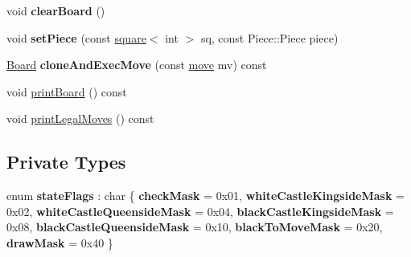 \begin{DoxyCompactItemize}
\mbox{\label{classBoard_a5f148daa03da25d40dff3fc613568d6f}} 
void {\bfseries clear\+Board} ()
\item 
\mbox{\label{classBoard_a2a15fa8b4b4db9d11093c6c806344fc6}} 
void {\bfseries set\+Piece} (const \hyperlink{structsquare}{square}$<$ int $>$ sq, const Piece\+::\+Piece piece)
\item 
\mbox{\label{classBoard_a3eb8e7257733fd3b9e00c8c37b8cc433}} 
\hyperlink{classBoard}{Board} {\bfseries clone\+And\+Exec\+Move} (const \hyperlink{structmove}{move} mv) const
\item 
void \hyperlink{classBoard_a3f5b48d92226217de5d488f3d5fb234a}{print\+Board} () const
\item 
void \hyperlink{classBoard_a8bb1bf8da102901b871b538255948dfa}{print\+Legal\+Moves} () const
\end{DoxyCompactItemize}
\subsection*{Private Types}
\begin{DoxyCompactItemize}
\item 
\mbox{\label{classBoard_a6f2173ec700556df381b6623a5482850}} 
enum {\bfseries state\+Flags} \+: char \{ \newline
{\bfseries check\+Mask} = 0x01, 
{\bfseries white\+Castle\+Kingside\+Mask} = 0x02, 
{\bfseries white\+Castle\+Queenside\+Mask} = 0x04, 
{\bfseries black\+Castle\+Kingside\+Mask} = 0x08, 
\newline
{\bfseries black\+Castle\+Queenside\+Mask} = 0x10, 
{\bfseries black\+To\+Move\+Mask} = 0x20, 
{\bfseries draw\+Mask} = 0x40
 \}
\end{DoxyCompactItemize}
